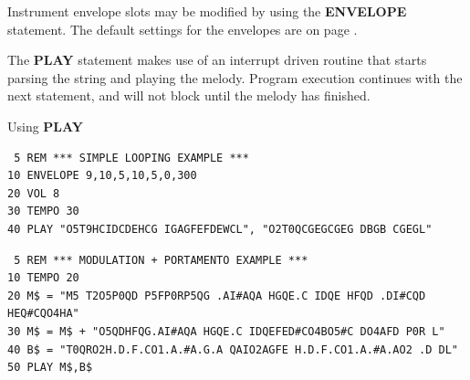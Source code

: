 \begin{description}[leftmargin=2cm,style=nextline]
  Instrument envelope slots may be modified by using the {\bf ENVELOPE}
  statement. The default settings for the envelopes are on
page \pageref{envelopetable}.

\item [Remarks:] The {\bf PLAY} statement makes use of an interrupt
                 driven routine that starts parsing the string
                 and playing the melody. Program execution continues
                 with the next statement, and will not block until
                 the melody has finished.


\item [Example:] Using {\bf PLAY}
\begin{tcolorbox}[colback=black,coltext=white]
\verbatimfont{\codefont}
\begin{verbatim}
 5 REM *** SIMPLE LOOPING EXAMPLE ***
10 ENVELOPE 9,10,5,10,5,0,300
20 VOL 8
30 TEMPO 30
40 PLAY "O5T9HCIDCDEHCG IGAGFEFDEWCL", "O2T0QCGEGCGEG DBGB CGEGL"
\end{verbatim}
\end{tcolorbox}

\begin{tcolorbox}[colback=black,coltext=white]
\verbatimfont{\codefont}
\begin{verbatim}
 5 REM *** MODULATION + PORTAMENTO EXAMPLE ***
10 TEMPO 20
20 M$ = "M5 T2O5P0QD P5FP0RP5QG .AI#AQA HGQE.C IDQE HFQD .DI#CQD HEQ#CQO4HA"
30 M$ = M$ + "O5QDHFQG.AI#AQA HGQE.C IDQEFED#CO4BO5#C DO4AFD P0R L"
40 B$ = "T0QRO2H.D.F.CO1.A.#A.G.A QAIO2AGFE H.D.F.CO1.A.#A.AO2 .D DL"
50 PLAY M$,B$
\end{verbatim}
\end{tcolorbox}
\end{description}


\newpage
